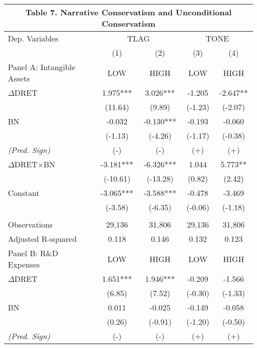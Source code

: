 \begin{table}[H] \label{T7}
	\begin{center}
		\tabcolsep=0.3cm
		\begin{tabular}{lcccc}
			\multicolumn{5}{c}{\textbf{Table 7. Narrative Conservatism and Unconditional Conservatism}} \\
			\toprule
			\toprule
			Dep. Variables & \multicolumn{2}{c}{TLAG} & \multicolumn{2}{c}{TONE} \\
			\cmidrule{2-5}
			& (1) & (2) & (3) & (4) \\
			\midrule
			Panel A: Intangible Assets & LOW & HIGH & LOW & HIGH \\
			\midrule
			$\Delta$DRET & 1.975*** & 3.026*** & -1.205 & -2.647** \\
			& (11.64) & (9.89) & (-1.23) & (-2.07) \\
			BN & -0.032 & -0.130*** & -0.193 & -0.060 \\
			& (-1.13) & (-4.26) & (-1.17) & (-0.38) \\
			\rowcolor[rgb]{ .906,  .902,  .902} \textit{(Pred. Sign)} & (-) & (-) & (+) & (+) \\
			\rowcolor[rgb]{ .906,  .902,  .902} $\Delta$DRET$\times$BN & -3.181*** & -6.326*** & 1.044 & 5.773** \\
			\rowcolor[rgb]{ .906,  .902,  .902} & (-10.61) & (-13.28) & (0.82) & (2.42) \\
			Constant & -3.065*** & -3.588*** & -0.478 & -3.469 \\
			& (-3.58) & (-6.35) & (-0.06) & (-1.18) \\
			&   &   &   &  \\
			Observations & 29,136 & 31,806 & 29,136 & 31,806 \\
			Adjusted R-squared & 0.118 & 0.146 & 0.132 & 0.123 \\
			\midrule
			Panel B: R\&D Expenses & LOW & HIGH & LOW & HIGH \\
			\midrule
			$\Delta$DRET & 1.651*** & 1.946*** & -0.209 & -1.566 \\
			& (6.85) & (7.52) & (-0.30) & (-1.33) \\
			BN & 0.011 & -0.025 & -0.149 & -0.058 \\
			& (0.26) & (-0.91) & (-1.20) & (-0.50) \\
			\rowcolor[rgb]{ .906,  .902,  .902} \textit{(Pred. Sign)} & (-) & (-) & (+) & (+) \\

\end{tabular}
\end{center}
\end{table}
